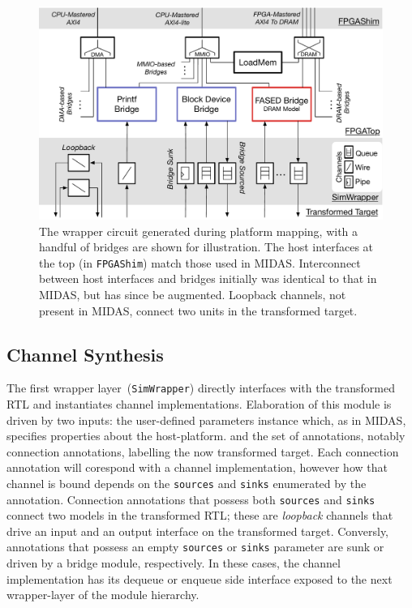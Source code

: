 \begin{figure}
  \centering
    \includegraphics[width=\columnwidth]{figures/sim-wrapper-layers.pdf}
    \caption{The wrapper circuit generated during platform mapping, with a handful of bridges are shown for
    illustration. The host interfaces at the top (in \texttt{FPGAShim}) match those used in MIDAS. Interconnect
    between host interfaces and bridges initially was identical to that in MIDAS, but has since be augmented.
    Loopback channels, not present in MIDAS, connect two units in the transformed target.
    }
  \label{fig:sim-wrapper-layers}
\end{figure}


\subsection{Channel Synthesis}
The first wrapper layer~(\texttt{SimWrapper}) directly interfaces with the transformed RTL and instantiates
channel implementations. Elaboration of this module is driven by two inputs: the user-defined parameters instance
which, as in MIDAS, specifies properties about the host-platform. and the set of
annotations, notably connection annotations, labelling the now transformed target.
Each connection annotation will corespond with a channel implementation, however how that channel
is bound depends on the \texttt{sources} and \texttt{sinks} enumerated by the annotation.
Connection annotations that possess both \texttt{sources} and \texttt{sinks}
connect two models in the transformed RTL; these are \emph{loopback} channels
that drive an input and an output interface on the transformed target. Conversly,
annotations that possess an empty \texttt{sources} or \texttt{sinks} parameter
are sunk or driven by a bridge module, respectively. In these cases, the
channel implementation has its dequeue or enqueue side
interface exposed to the next wrapper-layer of the module hierarchy.

